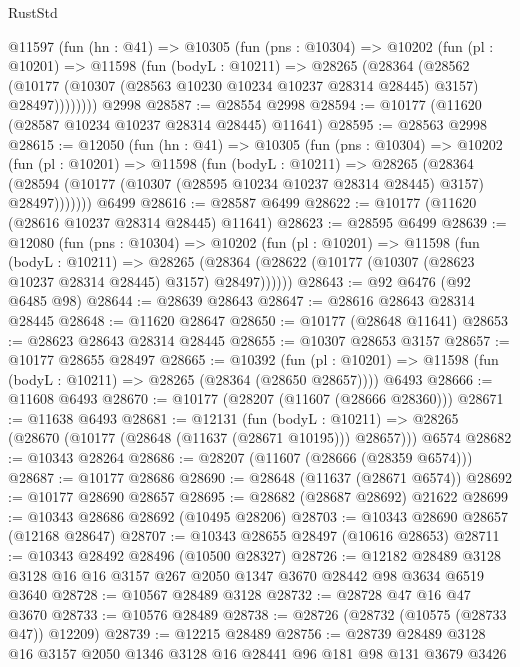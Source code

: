 \begin{lexlean}{RustStd}
\begin{coremodule}
    @11597
      (fun (hn : @41) =>
      @10305
        (fun (pns : @10304) =>
        @10202
          (fun (pl : @10201) =>
          @11598
            (fun (bodyL : @10211) =>
            @28265
              (@28364
                (@28562
                  (@10177 (@10307 (@28563 @10230 @10234 @10237 @28314 @28445) @3157) @28497))))))))
    @2998
@28587 := @28554 @2998
@28594 := @10177 (@11620 (@28587 @10234 @10237 @28314 @28445) @11641)
@28595 := @28563 @2998
@28615 := @12050
    (fun (hn : @41) =>
    @10305
      (fun (pns : @10304) =>
      @10202
        (fun (pl : @10201) =>
        @11598
          (fun (bodyL : @10211) =>
          @28265
            (@28364
              (@28594 (@10177 (@10307 (@28595 @10234 @10237 @28314 @28445) @3157) @28497)))))))
    @6499
@28616 := @28587 @6499
@28622 := @10177 (@11620 (@28616 @10237 @28314 @28445) @11641)
@28623 := @28595 @6499
@28639 := @12080
    (fun (pns : @10304) =>
    @10202
      (fun (pl : @10201) =>
      @11598
        (fun (bodyL : @10211) =>
        @28265 (@28364 (@28622 (@10177 (@10307 (@28623 @10237 @28314 @28445) @3157) @28497))))))
@28643 := @92 @6476 (@92 @6485 @98)
@28644 := @28639 @28643
@28647 := @28616 @28643 @28314 @28445
@28648 := @11620 @28647
@28650 := @10177 (@28648 @11641)
@28653 := @28623 @28643 @28314 @28445
@28655 := @10307 @28653 @3157
@28657 := @10177 @28655 @28497
@28665 := @10392
    (fun (pl : @10201) => @11598 (fun (bodyL : @10211) => @28265 (@28364 (@28650 @28657))))
    @6493
@28666 := @11608 @6493
@28670 := @10177 (@28207 (@11607 (@28666 @28360)))
@28671 := @11638 @6493
@28681 := @12131
    (fun (bodyL : @10211) => @28265 (@28670 (@10177 (@28648 (@11637 (@28671 @10195))) @28657)))
    @6574
@28682 := @10343 @28264
@28686 := @28207 (@11607 (@28666 (@28359 @6574)))
@28687 := @10177 @28686
@28690 := @28648 (@11637 (@28671 @6574))
@28692 := @10177 @28690 @28657
@28695 := @28682 (@28687 @28692) @21622
@28699 := @10343 @28686 @28692 (@10495 @28206)
@28703 := @10343 @28690 @28657 (@12168 @28647)
@28707 := @10343 @28655 @28497 (@10616 @28653)
@28711 := @10343 @28492 @28496 (@10500 @28327)
@28726 := @12182
    @28489
    @3128
    @3128
    @16
    @16
    @3157
    @267
    @2050
    @1347
    @3670
    @28442
    @98
    @3634
    @6519
    @3640
@28728 := @10567 @28489 @3128
@28732 := @28728 @47 @16 @47 @3670
@28733 := @10576 @28489
@28738 := @28726 (@28732 (@10575 (@28733 @47)) @12209)
@28739 := @12215 @28489
@28756 := @28739
    @28489
    @3128
    @16
    @3157
    @2050
    @1346
    @3128
    @16
    @28441
    @96
    @181
    @98
    @131
    @3679
    @3426

\end{coremodule}
\end{lexlean}
